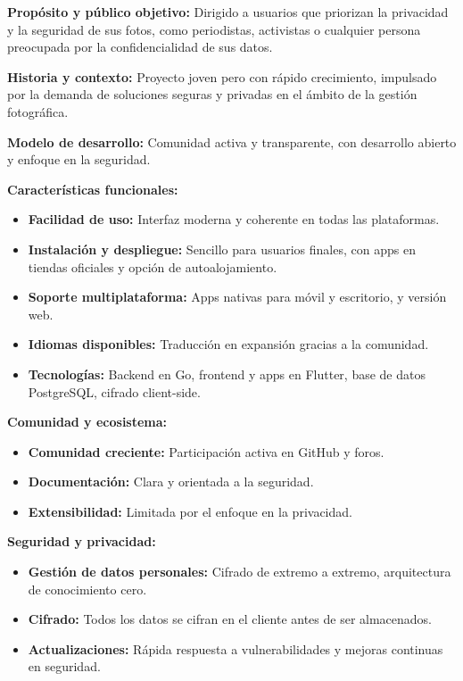 \textbf{Propósito y público objetivo:} Dirigido a usuarios que priorizan la privacidad y la seguridad de sus fotos, como periodistas, activistas o cualquier persona preocupada por la confidencialidad de sus datos.

\textbf{Historia y contexto:} Proyecto joven pero con rápido crecimiento, impulsado por la demanda de soluciones seguras y privadas en el ámbito de la gestión fotográfica.

\textbf{Modelo de desarrollo:} Comunidad activa y transparente, con desarrollo abierto y enfoque en la seguridad.

\textbf{Características funcionales:}
\begin{itemize}
    \item \textbf{Facilidad de uso:} Interfaz moderna y coherente en todas las plataformas.
    \item \textbf{Instalación y despliegue:} Sencillo para usuarios finales, con apps en tiendas oficiales y opción de autoalojamiento.
    \item \textbf{Soporte multiplataforma:} Apps nativas para móvil y escritorio, y versión web.
    \item \textbf{Idiomas disponibles:} Traducción en expansión gracias a la comunidad.
    \item \textbf{Tecnologías:} Backend en Go, frontend y apps en Flutter, base de datos PostgreSQL, cifrado client-side.
\end{itemize}

\textbf{Comunidad y ecosistema:}
\begin{itemize}
    \item \textbf{Comunidad creciente:} Participación activa en GitHub y foros.
    \item \textbf{Documentación:} Clara y orientada a la seguridad.
    \item \textbf{Extensibilidad:} Limitada por el enfoque en la privacidad.
\end{itemize}

\textbf{Seguridad y privacidad:}
\begin{itemize}
    \item \textbf{Gestión de datos personales:} Cifrado de extremo a extremo, arquitectura de conocimiento cero.
    \item \textbf{Cifrado:} Todos los datos se cifran en el cliente antes de ser almacenados.
    \item \textbf{Actualizaciones:} Rápida respuesta a vulnerabilidades y mejoras continuas en seguridad.
\end{itemize}

